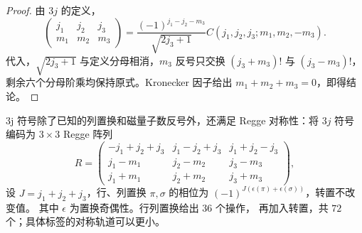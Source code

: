 \begin{proof}
由 $3j$ 的定义，
\[
\begin{pmatrix}j_1&j_2&j_3\\m_1&m_2&m_3\end{pmatrix}
=\frac{(-1)^{j_1-j_2-m_3}}{\sqrt{2j_3+1}}
C(j_1,j_2,j_3;m_1,m_2,-m_3).
\]
代入，$\sqrt{2j_3+1}$ 与定义分母相消，$m_3$ 反号只交换 $(j_3+m_3)!$ 与 $(j_3-m_3)!$，剩余六个分母阶乘均保持原式。Kronecker 因子给出 $m_1+m_2+m_3=0$，即得结论。
\end{proof}
\begin{proposition}
3j 符号除了已知的列置换和磁量子数反号外，还满足 Regge 对称性：将 $3j$ 符号编码为 $3\times3$ Regge 阵列
\[
R=\begin{pmatrix}
-j_1+j_2+j_3 & j_1-j_2+j_3 & j_1+j_2-j_3\\
j_1-m_1 & j_2-m_2 & j_3-m_3\\
j_1+m_1 & j_2+m_2 & j_3+m_3
\end{pmatrix},
\]
设 $J=j_1+j_2+j_3$，行、列置换 $\pi,\sigma$ 的相位为
$(-1)^{J(\epsilon(\pi)+\epsilon(\sigma))}$，转置不改变值。
其中 $\epsilon$ 为置换奇偶性。行列置换给出 $36$ 个操作，
再加入转置，共 $72$ 个；具体标签的对称轨道可以更小。
\end{proposition}

